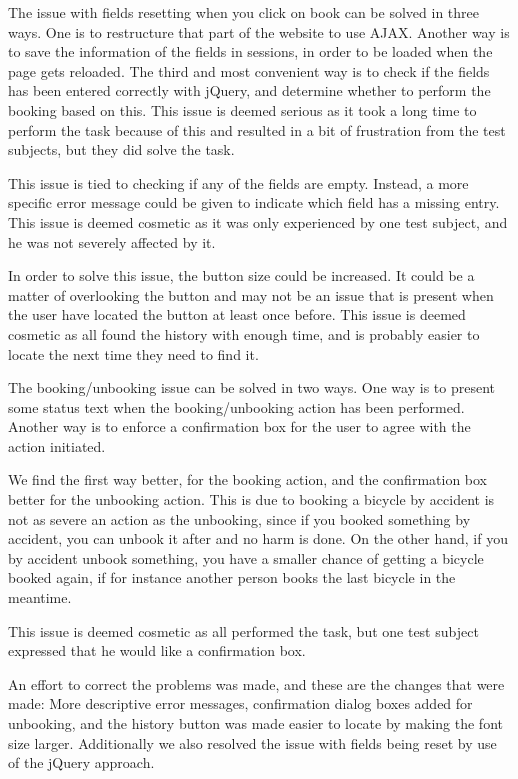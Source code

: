 \begin{description}[style=nextline]
	\item[{\#}1 Fields reset - Serious]
	The issue with fields resetting when you click on book can be solved in three ways.
	One is to restructure that part of the website to use AJAX.
	Another way is to save the information of the fields in sessions, in order to be loaded when the page gets reloaded. 
	The third and most convenient way is to check if the fields has been entered correctly with jQuery, and determine whether to perform the booking based on this.
	This issue is deemed serious as it took a long time to perform the task because of this and resulted in a bit of frustration from the test subjects, but they did solve the task.
	\item[{\#}2 Error message understandability - Cosmetic]
	This issue is tied to checking if any of the fields are empty.
	Instead, a more specific error message could be given to indicate which field has a missing entry.
	This issue is deemed cosmetic as it was only experienced by one test subject, and he was not severely affected by it.
	\item[{\#}3 Difficulty finding history - Cosmetic]
	In order to solve this issue, the button size could be increased.
	It could be a matter of overlooking the button and may not be an issue that is present when the user have located the button at least once before.
	This issue is deemed cosmetic as all found the history with enough time, and is probably easier to locate the next time they need to find it.
	\item[{\#}4 Booking/Unbooking confirmation - Cosmetic]
	The booking/unbooking issue can be solved in two ways.
	One way is to present some status text when the booking/unbooking action has been performed.
	Another way is to enforce a confirmation box for the user to agree with the action initiated.
	
	We find the first way better, for the booking action, and the confirmation box better for the unbooking action.
	This is due to booking a bicycle by accident is not as severe an action as the unbooking, since if you booked something by accident, you can unbook it after and no harm is done.
	On the other hand, if you by accident unbook something, you have a smaller chance of getting a bicycle booked again, if for instance another person books the last bicycle in the meantime.
	
	This issue is deemed cosmetic as all performed the task, but one test subject expressed that he would like a confirmation box.
\end{description}

An effort to correct the problems was made, and these are the changes that were made: More descriptive error messages, confirmation dialog boxes added for unbooking, and the history button was made easier to locate by making the font size larger.
Additionally we also resolved the issue with fields being reset by use of the jQuery approach.